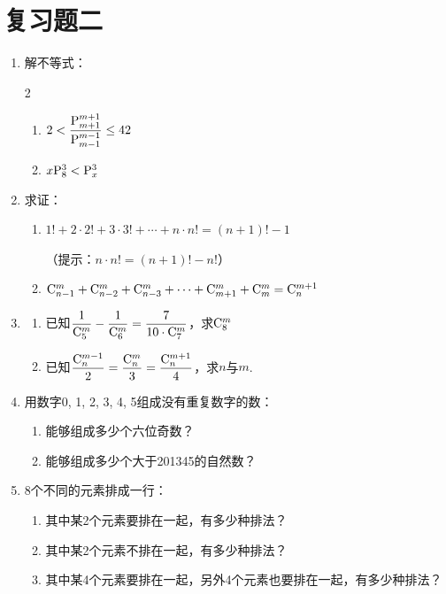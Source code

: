 \section*{复习题二}
\begin{enumerate}
    \item 解不等式：
\begin{multicols}{2}
\begin{enumerate}[(1)]
    \item $2<\dfrac{{\rm P}^{m+1}_{m+1}}{{\rm P}^{m-1}_{m-1}}\le 42$
    \item $x{\rm P}^{3}_{8}<{\rm P}^{3}_{x}$
\end{enumerate}
\end{multicols}

\item 求证：
\begin{enumerate}[(1)]
    \item $1!+2\cdot 2!+3\cdot 3!+\cdots+n\cdot n!=(n+1)!-1$
    
    （提示：$n\cdot n!=(n+1)!-n!$）

\item ${\rm C}^{m}_{n-1}+{\rm C}^{m}_{n-2}+{\rm C}^{m}_{n-3}+\cdots+{\rm C}^{m}_{m+1}+{\rm C}^{m}_{m}={\rm C}^{m+1}_{n}$
\end{enumerate}

\item \begin{enumerate}[(1)]
    \item 已知$\dfrac{1}{{\rm C}^{m}_{5}}-\dfrac{1}{{\rm C}^{m}_{6}}=\dfrac{7}{10\cdot{\rm C}^{m}_{7}}$，求${\rm C}^{m}_{8}$
    \item 已知$\dfrac{{\rm C}^{m-1}_{n}}{2}=\dfrac{{\rm C}^{m}_{n}}{3}=\dfrac{{\rm C}^{m+1}_{n}}{4}$，求$n$与$m$.
\end{enumerate}

\item 用数字0, 1, 2, 3, 4, 5组成没有重复数字的数：
\begin{enumerate}[(1)]
\item 能够组成多少个六位奇数？
\item 能够组成多少个大于201345的自然数？ 
\end{enumerate}

\item 8个不同的元素排成一行：
\begin{enumerate}[(1)]
 \item 其中某2个元素要排在一起，有多少种排法？
\item 其中某2个元素不排在一起，有多少种排法？
\item 其中某4个元素要排在一起，另外4个元素也要排在一起，有多少种排法？  
\end{enumerate}


\end{enumerate}
